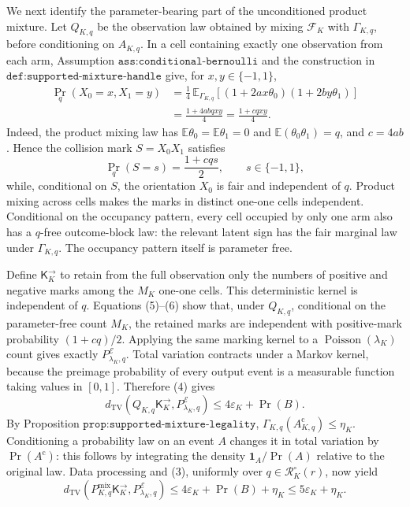 We next identify the parameter-bearing part of the unconditioned product
mixture.  Let \(Q_{K,q}\) be the observation law obtained by mixing
\(\mathcal F_K\) with \(\Gamma_{K,q}\), before conditioning on
\(A_{K,q}\).  In a cell containing exactly one observation from each
arm, Assumption \(\texttt{ass:conditional-bernoulli}\) and the
construction in \(\texttt{def:supported-mixture-handle}\) give, for
\(x,y\in\{-1,1\}\),
\[
\begin{aligned}
 \Pr_q(X_0=x,X_1=y)
 &=\frac14\,
   \mathbb E_{\Gamma_{K,q}}
   \left[(1+2ax\theta_0)(1+2by\theta_1)\right]\\
 &=\frac{1+4abqxy}{4}
 =\frac{1+cqxy}{4}.
\end{aligned}
\tag{5}
\]
Indeed, the product mixing law has
\(\mathbb E\theta_0=\mathbb E\theta_1=0\) and
\(\mathbb E(\theta_0\theta_1)=q\), and \(c=4ab\).  Hence the collision
mark \(S=X_0X_1\) satisfies
\[
 \Pr_q(S=s)=\frac{1+cqs}{2},
 \qquad s\in\{-1,1\},
 \tag{6}
\]
while, conditional on \(S\), the orientation \(X_0\) is fair and
independent of \(q\).  Product mixing across cells makes the marks in
distinct one-one cells independent.  Conditional on the occupancy
pattern, every cell occupied by only one arm also has a \(q\)-free
outcome-block law: the relevant latent sign has the fair marginal law
under \(\Gamma_{K,q}\).  The occupancy pattern itself is parameter free.

Define \(\mathsf K_K^{\to}\) to retain from the full observation only the
numbers of positive and negative marks among the \(M_K\) one-one cells.
This deterministic kernel is independent of \(q\).  Equations (5)--(6)
show that, under \(Q_{K,q}\), conditional on the parameter-free count
\(M_K\), the retained marks are independent with positive-mark
probability \((1+cq)/2\).  Applying the same marking kernel to a
\(\operatorname{Poisson}(\lambda_K)\) count gives exactly
\(P^{\mathcal E}_{\lambda_K,q}\).  Total variation contracts under a
Markov kernel, because the preimage probability of every output event is
a measurable function taking values in \([0,1]\).  Therefore (4) gives
\[
 d_{\mathrm{TV}}\!\left(
 Q_{K,q}\mathsf K_K^{\to},P^{\mathcal E}_{\lambda_K,q}\right)
 \le 4\varepsilon_K+\Pr(B).
 \tag{7}
\]
By Proposition \(\texttt{prop:supported-mixture-legality}\),
\(\Gamma_{K,q}(A_{K,q}^{\mathrm c})\le\eta_K\).  Conditioning a
probability law on an event \(A\) changes it in total variation by
\(\Pr(A^{\mathrm c})\): this follows by integrating the density
\(\mathbf 1_A/\Pr(A)\) relative to the original law.  Data processing
and (3), uniformly over \(q\in\mathcal R_K^\circ(r)\), now yield
\[
 d_{\mathrm{TV}}\!\left(
 P^{\mathrm{mix}}_{K,q}\mathsf K_K^{\to},
 P^{\mathcal E}_{\lambda_K,q}\right)
 \le 4\varepsilon_K+\Pr(B)+\eta_K
 \le 5\varepsilon_K+\eta_K.
 \tag{8}
\]

